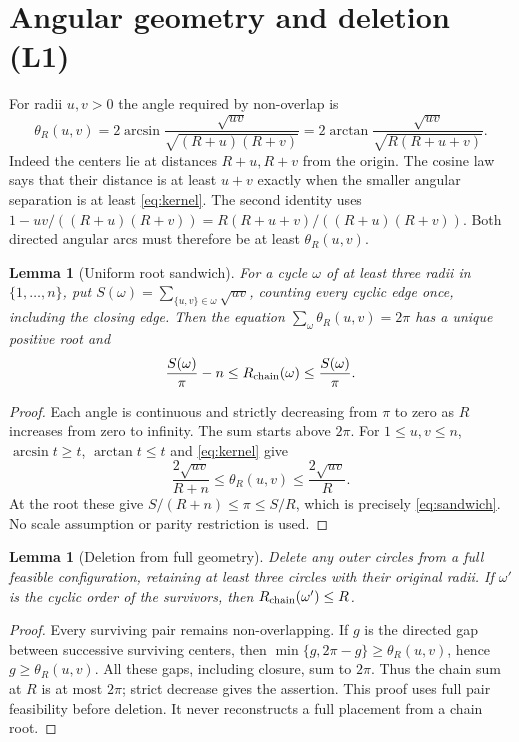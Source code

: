 \documentclass[11pt,a4paper]{article}
\newtheorem{lemma}[theorem]{Lemma}
\theoremstyle{remark}\newtheorem{remark}[theorem]{Remark}
\newcommand{\Rc}{R_{\rm chain}}
\begin{document}
\section{Angular geometry and deletion (L1)}\label{sec:geometry}
For radii $u,v>0$ the angle required by non-overlap is
\begin{equation}\label{eq:kernel}
\theta_R(u,v)=2\arcsin\frac{\sqrt{uv}}{\sqrt{(R+u)(R+v)}}
=2\arctan\frac{\sqrt{uv}}{\sqrt{R(R+u+v)}}.
\end{equation}
Indeed the centers lie at distances $R+u,R+v$ from the origin. The cosine
law says that their distance is at least $u+v$ exactly when the smaller
angular separation is at least \eqref{eq:kernel}. The second identity
uses $1-uv/((R+u)(R+v))=R(R+u+v)/((R+u)(R+v))$.
Both directed angular arcs must therefore be at least $\theta_R(u,v)$.

\begin{lemma}[Uniform root sandwich]\label{lem:sandwich}
For a cycle $\omega$ of at least three radii in $\{1,\ldots,n\}$, put
$S(\omega)=\sum_{\{u,v\}\in\omega}\sqrt{uv}$, counting every cyclic edge
once, including the closing edge. Then the equation
$\sum_{\omega}\theta_R(u,v)=2\pi$ has a unique positive root and
\begin{equation}\label{eq:sandwich}
\frac{S(\omega)}\pi-n\le\Rc(\omega)\le\frac{S(\omega)}\pi.
\end{equation}
\end{lemma}
\begin{proof}
Each angle is continuous and strictly decreasing from $\pi$ to zero as
$R$ increases from zero to infinity. The sum starts above $2\pi$.
For $1\le u,v\le n$, $\arcsin t\ge t$, $\arctan t\le t$ and
\eqref{eq:kernel} give
\[
\frac{2\sqrt{uv}}{R+n}\le\theta_R(u,v)\le\frac{2\sqrt{uv}}R.
\]
At the root these give $S/(R+n)\le\pi\le S/R$, which is precisely
\eqref{eq:sandwich}. No scale assumption or parity restriction is used.
\end{proof}

\begin{lemma}[Deletion from full geometry]\label{lem:deletiongeometry}
Delete any outer circles from a full feasible configuration, retaining
at least three circles with their original radii. If $\omega'$ is the
cyclic order of the survivors, then $\Rc(\omega')\le R$.
\end{lemma}
\begin{proof}
Every surviving pair remains non-overlapping. If $g$ is the directed gap
between successive surviving centers, then
$\min\{g,2\pi-g\}\ge\theta_R(u,v)$, hence $g\ge\theta_R(u,v)$.
All these gaps, including closure, sum to $2\pi$. Thus the chain sum
at $R$ is at most $2\pi$; strict decrease gives the assertion.
This proof uses full pair feasibility before deletion. It never reconstructs
a full placement from a chain root.
\end{proof}
\end{document}
